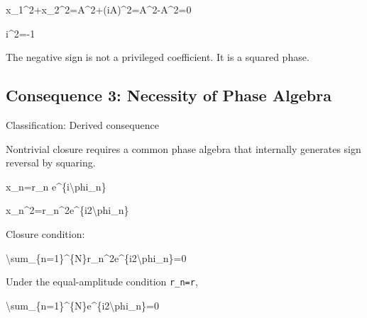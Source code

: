 \documentclass[
  a4paper,
]{article}
\newenvironment{Shaded}{}{}
\newcommand{\NormalTok}[1]{#1}
\begin{document}
\begin{Shaded}
\begin{Highlighting}[]
\NormalTok{x\_1\^{}2+x\_2\^{}2=A\^{}2+(iA)\^{}2=A\^{}2{-}A\^{}2=0}
\end{Highlighting}
\end{Shaded}

\begin{Shaded}
\begin{Highlighting}[]
\NormalTok{i\^{}2={-}1}
\end{Highlighting}
\end{Shaded}

The negative sign is not a privileged coefficient. It is a squared
phase.

\subsection{Consequence 3: Necessity of Phase
Algebra}\label{consequence-3-necessity-of-phase-algebra}

Classification: Derived consequence

Nontrivial closure requires a common phase algebra that internally
generates sign reversal by squaring.

\begin{Shaded}
\begin{Highlighting}[]
\NormalTok{x\_n=r\_n e\^{}\{i\textbackslash{}phi\_n\}}
\end{Highlighting}
\end{Shaded}

\begin{Shaded}
\begin{Highlighting}[]
\NormalTok{x\_n\^{}2=r\_n\^{}2e\^{}\{i2\textbackslash{}phi\_n\}}
\end{Highlighting}
\end{Shaded}

Closure condition:

\begin{Shaded}
\begin{Highlighting}[]
\NormalTok{\textbackslash{}sum\_\{n=1\}\^{}\{N\}r\_n\^{}2e\^{}\{i2\textbackslash{}phi\_n\}=0}
\end{Highlighting}
\end{Shaded}

Under the equal-amplitude condition \texttt{r\_n=r},

\begin{Shaded}
\begin{Highlighting}[]
\NormalTok{\textbackslash{}sum\_\{n=1\}\^{}\{N\}e\^{}\{i2\textbackslash{}phi\_n\}=0}
\end{Highlighting}
\end{Shaded}
\end{document}
